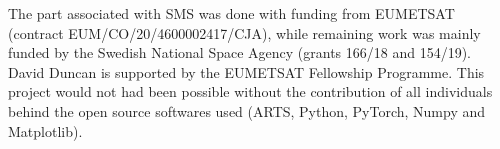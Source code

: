 \documentclass[amt, manuscript]{copernicus}
\begin{document}



\appendixfigures  %

\appendixtables   %








\begin{acknowledgements}
The part associated with SMS was done with funding from EUMETSAT (contract  EUM/CO/20/4600002417/CJA), while remaining work was mainly funded by the Swedish National Space Agency (grants 166/18 and 154/19). David Duncan is supported by the EUMETSAT Fellowship Programme.
This project would not had been possible without the contribution of all individuals behind the open source softwares used (ARTS, Python, PyTorch, Numpy and Matplotlib).
\end{acknowledgements}




 
 
\end{document}
